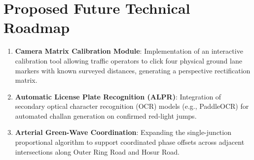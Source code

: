 \section{Proposed Future Technical Roadmap}
\begin{enumerate}[leftmargin=*]
    \item \textbf{Camera Matrix Calibration Module}: Implementation of an interactive calibration tool allowing traffic operators to click four physical ground lane markers with known surveyed distances, generating a perspective rectification matrix.
    \item \textbf{Automatic License Plate Recognition (ALPR)}: Integration of secondary optical character recognition (OCR) models (e.g., PaddleOCR) for automated challan generation on confirmed red-light jumps.
    \item \textbf{Arterial Green-Wave Coordination}: Expanding the single-junction proportional algorithm to support coordinated phase offsets across adjacent intersections along Outer Ring Road and Hosur Road.
\end{enumerate}
